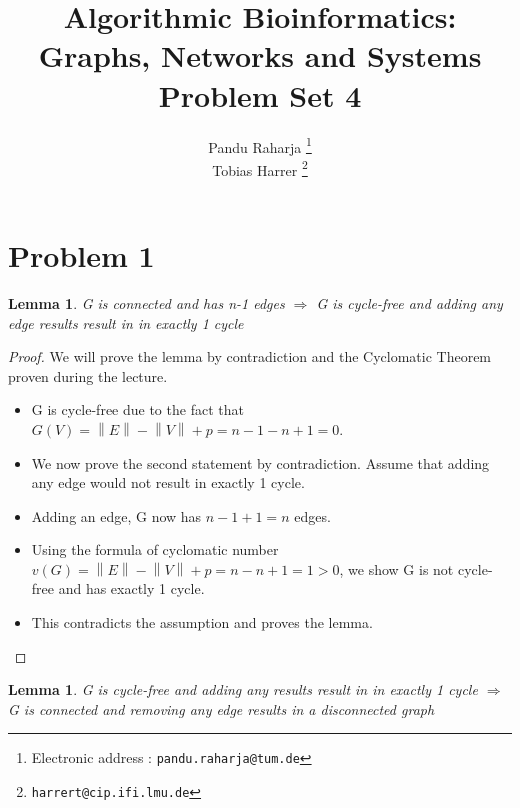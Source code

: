 \documentclass[a4paper]{article}
\newtheorem{lemma}[theorem]{Lemma}
\begin{document}
\title{Algorithmic Bioinformatics: Graphs, Networks and Systems \\ Problem Set 4}

\author{Pandu Raharja %
  \thanks{Electronic address : \texttt{pandu.raharja@tum.de}} \\
  Tobias Harrer %
  \thanks{\texttt{harrert@cip.ifi.lmu.de}}}

\maketitle


\section{Problem 1}

\begin{lemma}
G is connected and has n-1 edges \(\Rightarrow\) G is cycle-free and adding any edge results result in in exactly 1 cycle
\end{lemma}

\begin{proof} We will prove the lemma by contradiction and the Cyclomatic Theorem proven during the lecture.
\begin{itemize}

\item G is cycle-free due to the fact that \(G(V) = \left\|E\right\| - \left\|V\right\| + p = n - 1 - n + 1 = 0\). 

\item We now prove the second statement by contradiction. Assume that adding any edge would not result in exactly 1 cycle. 

\item Adding an edge, G now has \(n - 1 + 1 = n\) edges.

\item Using the formula of cyclomatic number \(v(G) = \left\|E\right\| - \left\|V\right\| + p = n - n  + 1 = 1 > 0\), we show G is not cycle-free and has exactly 1 cycle.

\item This contradicts the assumption and proves the lemma.
\end{itemize}
\end{proof}

\begin{lemma}
G is cycle-free and adding any results result in in exactly 1 cycle \(\Rightarrow\) G is connected and removing any edge results in a disconnected graph
\end{lemma}
\end{document}
